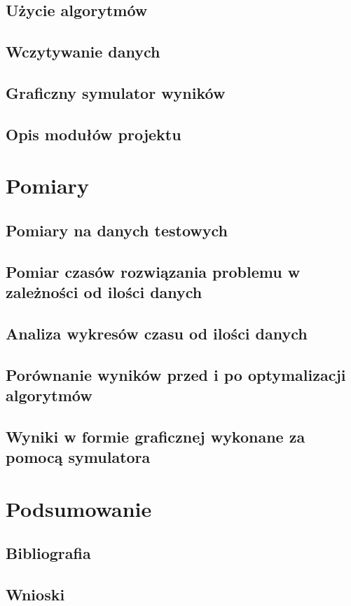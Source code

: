 \documentclass{article}
\begin{document}
  \subsection{Użycie algorytmów}
  \subsection{Wczytywanie danych}
  \subsection{Graficzny symulator wyników}
  \subsection{Opis modułów projektu}

  \section{Pomiary}
  \subsection{Pomiary na danych testowych}
  \subsection{Pomiar czasów rozwiązania problemu w zależności od ilości danych}
  \subsection{Analiza wykresów czasu od ilości danych}
  \subsection{Porównanie wyników przed i po optymalizacji algorytmów}
  \subsection{Wyniki w formie graficznej wykonane za pomocą symulatora}

  \section{Podsumowanie}
  \subsection{Bibliografia}
  \subsection{Wnioski}
\end{document}
